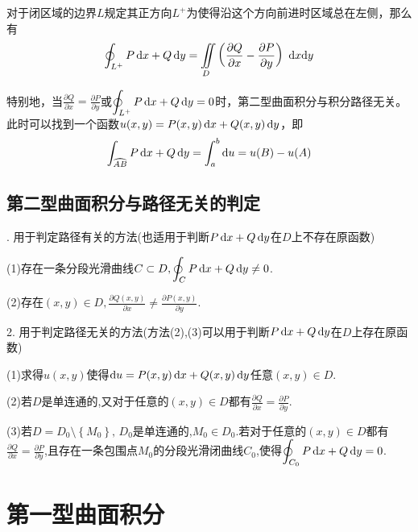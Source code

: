 \theorem[格林公式]
对于闭区域的边界$L$规定其正方向$L^+$为使得沿这个方向前进时区域总在左侧，那么有
\begin{equation}
	\oint_{L^+}P\,{\rm{d}} x+Q\,{\rm{d}} y = \iint\limits_{D}\left( \frac{\partial Q}{\partial x} -\frac{\partial P}{\partial y}\right) \,\, {\rm{d}} x {\rm{d}} y
\end{equation}
\par 特别地，当$\displaystyle\frac{\partial Q}{\partial x} =\frac{\partial P}{\partial y}$或$\displaystyle \oint_{L^+}P\,{\rm{d}} x+Q\,{\rm{d}} y =0$时，第二型曲面积分与积分路径无关。\\[0.5em]
此时可以找到一个函数$u(x,y)=P(x,y) \, {\rm{d}} x+Q(x,y)\,{\rm{d}} y$，即
\begin{equation}
	\int_{\wideparen{AB}}P\,\d x+Q\,\d y  =\int_{a}^{b} \d u = u(B)-u(A)
\end{equation}
\newpage

\subsection{第二型曲面积分与路径无关的判定}
. 用于判定路径有关的方法(也适用于判断$P\,{\rm{d}} x+Q\,{\rm{d}} y$在$D$上不存在原函数)
\par \quad \quad (1)\quad 存在一条分段光滑曲线$C\subset D,\displaystyle \oint_{C}P\,{\rm{d}} x+Q\,{\rm{d}} y\ne 0$.
\jg
\par \quad \quad (2)\quad 存在$(x,y)\in D,\displaystyle \frac{\partial Q(x,y)}{\partial x}\ne \frac{\partial P(x,y)}{\partial y}$.
\jg
\par 2. 用于判定路径无关的方法(方法(2),(3)可以用于判断$P\,{\rm{d}} x+Q\,{\rm{d}} y$在$D$上存在原函数)
\par \quad \quad (1)\quad 求得$u(x,y)$使得${\rm{d}} u=P(x,y)\,{\rm{d}} x+Q(x,y)\,{\rm{d}} y$任意$(x,y)\in D$.
\jg
\par \quad \quad (2)\quad 若$D$是单连通的,又对于任意的$(x,y)\in D$都有$\displaystyle\frac{\partial Q}{\partial x} =\frac{\partial P}{\partial y}$.
\jg
\par \quad \quad (3)\quad 若$D=D_0\setminus\left\lbrace M_0\right\rbrace,\,D_0 $是单连通的,$M_0\in D_0$.若对于任意的$(x,y)\in D$都有$\displaystyle\frac{\partial Q}{\partial x} =\frac{\partial P}{\partial y}$,且存在一条包围点$M_0$的分段光滑闭曲线$C_0$,使得$\displaystyle \oint_{C_0}P\,{\rm{d}} x+Q\,{\rm{d}} y= 0$.


\section{第一型曲面积分}
